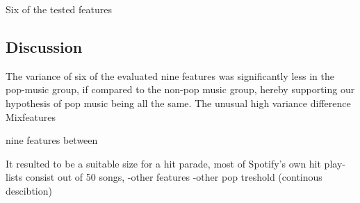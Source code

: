\documentclass{article}
\begin{document}



Six of the tested features  %

\subsection{Discussion}
The variance of six of the evaluated nine features was significantly less in the pop-music group, if compared to the non-pop music group, hereby supporting our hypothesis of pop music being all the same.  
The unusual high variance difference 
Mixfeatures


nine features between 




 It resulted  to be a suitable size for a hit parade, most of Spotify's own hit play-lists consist out of 50 songs, 
-other features
-other pop treshold (continous descibtion)



\end{document}
